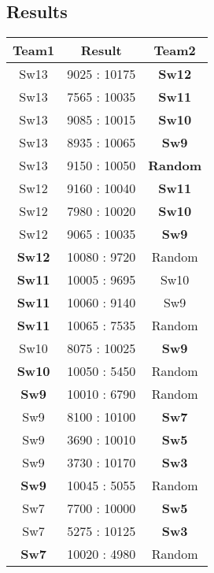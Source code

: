 \subsection*{Results}

\begin{table}[H]
  \centering
  \label{tab:splitresults}
  \begin{tabular}{ccc}
    \textbf{Team1} & \textbf{Result}  & \textbf{Team2}\\
    \hline
    Sw13 &  9025 : 10175 & \textbf{Sw12}\\
    \hline
    Sw13 & 7565 : 10035  & \textbf{Sw11}\\
    \hline
    Sw13 &  9085 : 10015 & \textbf{Sw10}\\
    \hline
    Sw13 & 8935 : 10065  & \textbf{Sw9}\\
    \hline
    Sw13 &  9150 : 10050 & \textbf{Random}\\
    \hline

    Sw12 & 9160 : 10040  & \textbf{Sw11}\\
    \hline
    Sw12 & 7980 : 10020  & \textbf{Sw10}\\
    \hline
    Sw12 & 9065 : 10035  & \textbf{Sw9}\\
    \hline
    \textbf{Sw12} & 10080 : 9720  & Random\\
    \hline

    \textbf{Sw11} & 10005 : 9695  & Sw10\\
    \hline
    \textbf{Sw11} & 10060 : 9140  & Sw9\\
    \hline
    \textbf{Sw11} &  10065 : 7535 & Random\\
    \hline

    Sw10 & 8075 : 10025  & \textbf{Sw9}\\
    \hline
    \textbf{Sw10} & 10050 : 5450  & Random\\
    \hline
    \textbf{Sw9} & 10010 : 6790  & Random\\
    \hline

    Sw9 & 8100 : 10100  & \textbf{Sw7}\\
    \hline
    Sw9 & 3690 : 10010 & \textbf{Sw5}\\
    \hline
    Sw9 & 3730 : 10170  & \textbf{Sw3}\\
    \hline
    \textbf{Sw9} & 10045 : 5055  & Random\\
    \hline


    Sw7 & 7700 : 10000 & \textbf{Sw5}\\
    \hline
    Sw7 &  5275 : 10125 & \textbf{Sw3}\\
    \hline
    \textbf{Sw7} &  10020 : 4980 & Random\\
    \hline


\end{tabular}
\end{table}
